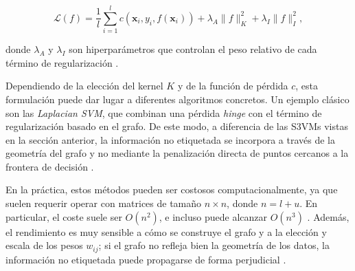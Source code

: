 \begin{equation}
    \mathcal{L}(f) = \frac{1}{l} \sum_{i=1}^l c(\mathbf{x}_i,y_i,f(\mathbf{x}_i)) + \lambda_A \|f\|_K^2 + \lambda_I \|f\|_I^2,
\end{equation}

donde $\lambda_A$ y $\lambda_I$ son hiperparámetros que controlan el peso relativo de cada término de regularización \cite{belkin2005manifold}.

Dependiendo de la elección del kernel $K$ y de la función de pérdida $c$, esta formulación puede dar lugar a diferentes algoritmos concretos. Un ejemplo clásico son las \textit{Laplacian SVM}, que combinan una pérdida \textit{hinge} con el término de regularización basado en el grafo. De este modo, a diferencia de las \glspl{S3VM} vistas en la sección anterior, la información no etiquetada se incorpora a través de la geometría del grafo y no mediante la penalización directa de puntos cercanos a la frontera de decisión \cite{van2020survey}.

En la práctica, estos métodos pueden ser costosos computacionalmente, ya que suelen requerir operar con matrices de tamaño $n\times n$, donde $n=l+u$. En particular, el coste suele ser $O(n^2)$, e incluso puede alcanzar $O(n^3)$ \cite{van2020survey}. Además, el rendimiento es muy sensible a cómo se construye el grafo y a la elección y escala de los pesos $w_{ij}$; si el grafo no refleja bien la geometría de los datos, la información no etiquetada puede propagarse de forma perjudicial \cite{zhu2009introduction}.